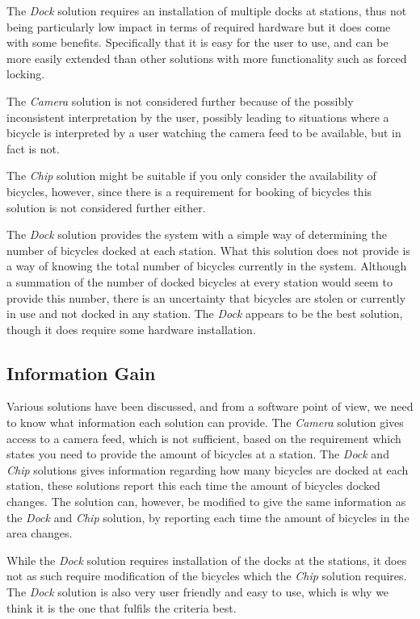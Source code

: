The \textit{Dock} solution requires an installation of multiple docks at stations, thus not being particularly low impact in terms of required hardware but it does come with some benefits.
Specifically that it is easy for the user to use, and can be more easily extended than other solutions with more functionality such as forced locking.

The \textit{Camera} solution is not considered further because of the possibly inconsistent interpretation by the user, possibly leading to situations where a bicycle is interpreted by a user watching the camera feed to be available, but in fact is not.

The \textit{Chip} solution might be suitable if you only consider the availability of bicycles, however, since there is a requirement for booking of bicycles this solution is not considered further either.

The \textit{Dock} solution provides the system with a simple way of determining the number of bicycles docked at each station.
What this solution does not provide is a way of knowing the total number of bicycles currently in the system.
Although a summation of the number of docked bicycles at every station would seem to provide this number, there is an uncertainty that bicycles are stolen or currently in use and not docked in any station.
The \textit{Dock} appears to be the best solution, though it does require some hardware installation.

\subsection{Information Gain}
Various solutions have been discussed, and from a software point of view, we need to know what information each solution can provide.
The \textit{Camera} solution gives access to a camera feed, which is not sufficient, based on the requirement which states you need to provide the amount of bicycles at a station.
The \textit{Dock} and \textit{Chip} solutions gives information regarding how many bicycles are docked at each station, these solutions report this each time the amount of bicycles docked changes.
The solution can, however, be modified to give the same information as the \textit{Dock} and \textit{Chip} solution, by reporting each time the amount of bicycles in the area changes.

While the \textit{Dock} solution requires installation of the docks at the stations, it does not as such require modification of the bicycles which the \textit{Chip} solution requires. 
The \textit{Dock} solution is also very user friendly and easy to use, which is why we think it is the one that fulfils the criteria best.